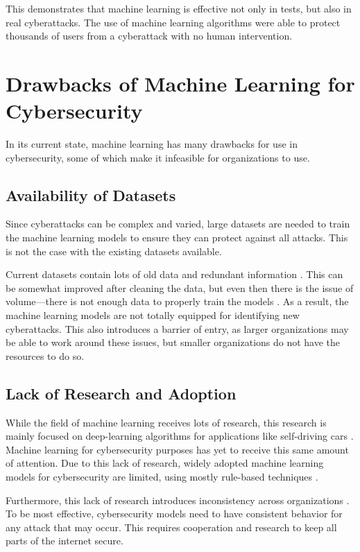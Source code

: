 This demonstrates that machine learning is effective not only in tests, but also in real cyberattacks.
The use of machine learning algorithms were able to protect thousands of users from a cyberattack with no human intervention.

\section{Drawbacks of Machine Learning for Cybersecurity}
In its current state, machine learning has many drawbacks for use in cybersecurity, some of which make it infeasible for organizations to use.

\subsection{Availability of Datasets}
Since cyberattacks can be complex and varied, large datasets are needed to train the machine learning models to ensure they can protect against all attacks.
This is not the case with the existing datasets available.

Current datasets contain lots of old data and redundant information \cite{xin2018}.
This can be somewhat improved after cleaning the data, but even then there is the issue of volume---there is not enough data to properly train the models \cite{xin2018}.
As a result, the machine learning models are not totally equipped for identifying new cyberattacks.
This also introduces a barrier of entry, as larger organizations may be able to work around these issues, but smaller organizations do not have the resources to do so.

\subsection{Lack of Research and Adoption}
While the field of machine learning receives lots of research, this research is mainly focused on deep-learning algorithms for applications like self-driving cars \cite{grandchallenge2019}.
Machine learning for cybersecurity purposes has yet to receive this same amount of attention.
Due to this lack of research, widely adopted machine learning models for cybersecurity are limited, using mostly rule-based techniques \cite{grandchallenge2019}.

Furthermore, this lack of research introduces inconsistency across organizations \cite{grandchallenge2019}.
To be most effective, cybersecurity models need to have consistent behavior for any attack that may occur.
This requires cooperation and research to keep all parts of the internet secure.

